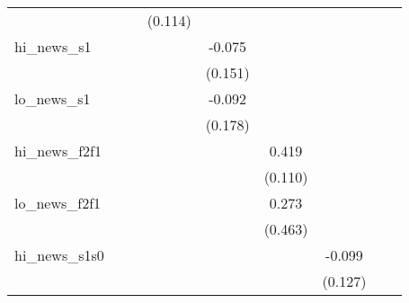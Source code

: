 {\begin{tabular}{l*{8}{c}}
            &                     &                     &     (0.114)         &                     &                     &                     &                     &                     \\
\addlinespace
hi\_news\_s1  &                     &                     &                     &      -0.075         &                     &                     &                     &                     \\
            &                     &                     &                     &     (0.151)         &                     &                     &                     &                     \\
\addlinespace
lo\_news\_s1  &                     &                     &                     &      -0.092         &                     &                     &                     &                     \\
            &                     &                     &                     &     (0.178)         &                     &                     &                     &                     \\
\addlinespace
hi\_news\_f2f1&                     &                     &                     &                     &       0.419\sym{***}&                     &                     &                     \\
            &                     &                     &                     &                     &     (0.110)         &                     &                     &                     \\
\addlinespace
lo\_news\_f2f1&                     &                     &                     &                     &       0.273         &                     &                     &                     \\
            &                     &                     &                     &                     &     (0.463)         &                     &                     &                     \\
\addlinespace
hi\_news\_s1s0&                     &                     &                     &                     &                     &      -0.099         &                     &                     \\
            &                     &                     &                     &                     &                     &     (0.127)         &                     &                     \\

\end{tabular}}
